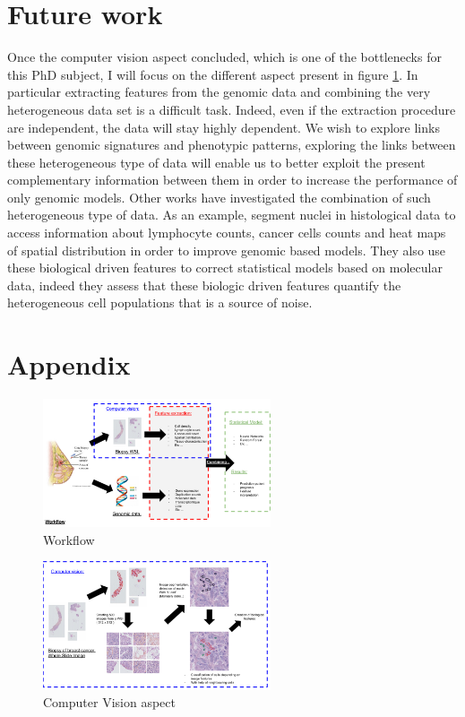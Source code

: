 \documentclass[a4paper,10pt,twocolumn]{article}
\begin{document}
 \section{Future work}
Once the computer vision aspect concluded, which is one of the
bottlenecks for this PhD subject, I will focus on the different aspect
present in figure \ref{workflow1}. In particular extracting features
from the genomic data and combining the very heterogeneous data set is
a difficult task. Indeed, even if the extraction procedure are
independent, the data will stay highly dependent. We wish to explore
links between genomic signatures and phenotypic patterns, exploring
the links between these heterogeneous type of data will enable us to
better exploit the present complementary information between them in
order to increase the performance of only genomic models. Other works
have investigated the combination of such heterogeneous type of
data. As an example, \citet{yuan2012quantitative} segment nuclei in  
 histological data to access information about lymphocyte counts,
 cancer cells counts and heat maps of spatial distribution in order to
 improve genomic based models.  They also use these biological  driven
 features to correct statistical models based on molecular data,
 indeed they assess that  these biologic driven features quantify the
 heterogeneous cell populations that is a source of  noise. 
 
 \newpage
 

\section*{Appendix}


%
{\footnotesize
}


 \begin{figure}[!ht]
\centering
\includegraphics[width=0.6\textwidth]{Workflow_overview.png}
\caption{Workflow}
\label{workflow1}
\end{figure}


\begin{figure}[!ht]
\centering
\includegraphics[width=0.6\textwidth]{ComputerVision.png}
\caption{Computer Vision aspect}
\label{fig:ComputerVision}
\end{figure}
\end{document}
